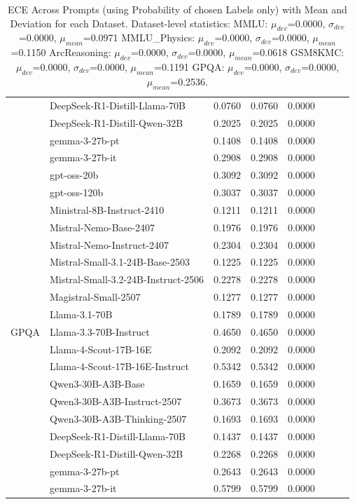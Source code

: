 \begin{table}[h]
{\begin{tabular}{l|lcccc|cc}
        & DeepSeek-R1-Distill-Llama-70B & 0.0760 & 0.0760 & 0.0000 \\
        & DeepSeek-R1-Distill-Qwen-32B & 0.2025 & 0.2025 & 0.0000 \\
        & gemma-3-27b-pt & 0.1408 & 0.1408 & 0.0000 \\
        & gemma-3-27b-it & 0.2908 & 0.2908 & 0.0000 \\
        \midrule
        \multirow{19}{*}{GPQA} & gpt-oss-20b & 0.3092 & 0.3092 & 0.0000 \\
        & gpt-oss-120b & 0.3037 & 0.3037 & 0.0000 \\
        & Ministral-8B-Instruct-2410 & 0.1211 & 0.1211 & 0.0000 \\
        & Mistral-Nemo-Base-2407 & 0.1976 & 0.1976 & 0.0000 \\
        & Mistral-Nemo-Instruct-2407 & 0.2304 & 0.2304 & 0.0000 \\
        & Mistral-Small-3.1-24B-Base-2503 & 0.1225 & 0.1225 & 0.0000 \\
        & Mistral-Small-3.2-24B-Instruct-2506 & 0.2278 & 0.2278 & 0.0000 \\
        & Magistral-Small-2507 & 0.1277 & 0.1277 & 0.0000 \\
        & Llama-3.1-70B & 0.1789 & 0.1789 & 0.0000 \\
        & Llama-3.3-70B-Instruct & 0.4650 & 0.4650 & 0.0000 \\
        & Llama-4-Scout-17B-16E & 0.2092 & 0.2092 & 0.0000 \\
        & Llama-4-Scout-17B-16E-Instruct & 0.5342 & 0.5342 & 0.0000 \\
        & Qwen3-30B-A3B-Base & 0.1659 & 0.1659 & 0.0000 \\
        & Qwen3-30B-A3B-Instruct-2507 & 0.3673 & 0.3673 & 0.0000 \\
        & Qwen3-30B-A3B-Thinking-2507 & 0.1693 & 0.1693 & 0.0000 \\
        & DeepSeek-R1-Distill-Llama-70B & 0.1437 & 0.1437 & 0.0000 \\
        & DeepSeek-R1-Distill-Qwen-32B & 0.2268 & 0.2268 & 0.0000 \\
        & gemma-3-27b-pt & 0.2643 & 0.2643 & 0.0000 \\
        & gemma-3-27b-it & 0.5799 & 0.5799 & 0.0000 \\
        \midrule
        \bottomrule
    \end{tabular}
    }
    \caption{ECE Across Prompts (using Probability of chosen Labels only) with Mean and Deviation for each Dataset. Dataset-level statistics: MMLU: $\mu_{dev}$=0.0000, $\sigma_{dev}$=0.0000, $\mu_{mean}$=0.0971 MMLU_Physics: $\mu_{dev}$=0.0000, $\sigma_{dev}$=0.0000, $\mu_{mean}$=0.1150 ArcReasoning: $\mu_{dev}$=0.0000, $\sigma_{dev}$=0.0000, $\mu_{mean}$=0.0618 GSM8KMC: $\mu_{dev}$=0.0000, $\sigma_{dev}$=0.0000, $\mu_{mean}$=0.1191 GPQA: $\mu_{dev}$=0.0000, $\sigma_{dev}$=0.0000, $\mu_{mean}$=0.2536. }
    \label{tab:ece}
\end{table}
